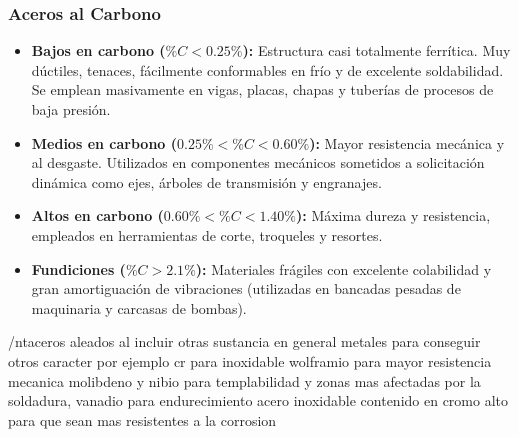 \subsubsection{Aceros al Carbono}
\begin{itemize}
    \item \textbf{Bajos en carbono ($\%C < 0.25\%$):} Estructura casi totalmente ferrítica. Muy dúctiles, tenaces, fácilmente conformables en frío y de excelente soldabilidad. Se emplean masivamente en vigas, placas, chapas y tuberías de procesos de baja presión.
    \item \textbf{Medios en carbono ($0.25\% < \%C < 0.60\%$):} Mayor resistencia mecánica y al desgaste. Utilizados en componentes mecánicos sometidos a solicitación dinámica como ejes, árboles de transmisión y engranajes.
    \item \textbf{Altos en carbono ($0.60\% < \%C < 1.40\%$):} Máxima dureza y resistencia, empleados en herramientas de corte, troqueles y resortes.
    \item \textbf{Fundiciones ($\%C > 2.1\%$):} Materiales frágiles con excelente colabilidad y gran amortiguación de vibraciones (utilizadas en bancadas pesadas de maquinaria y carcasas de bombas).
\end{itemize}
/nt{aceros aleados al incluir otras sustancia en general metales para conseguir otros caracter por ejemplo cr para inoxidable wolframio para mayor resistencia mecanica molibdeno y nibio para templabilidad y zonas mas afectadas por la soldadura, vanadio para endurecimiento
acero inoxidable contenido en cromo alto para que sean mas resistentes a la corrosion
}%

